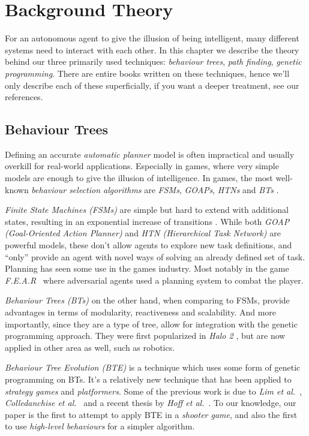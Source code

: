 \documentclass[a4paper, twocolumn]{article}
\begin{document}
    \section{Background Theory} \label{sec:background_theory}

    For an autonomous agent to give the illusion of being intelligent, many different systems need to interact with each other. In this chapter we describe the theory behind our three primarily used techniques: \emph{behaviour trees}, \emph{path finding}, \emph{genetic programming}. There are entire books written on these techniques, hence we'll only describe each of these superficially, if you want a deeper treatment, see our references.

        \subsection{Behaviour Trees} \label{sec:behaviour_trees}

        Defining an accurate \emph{automatic planner} model is often impractical and usually overkill for real-world applications. Especially in games, where very simple models are enough to give the illusion of intelligence. In games, the most well-known \emph{behaviour selection algorithms} are \emph{FSMs}, \emph{GOAPs}, \emph{HTNs} and \emph{BTs} \cite{dawe2014overview}.

        \emph{Finite State Machines (FSMs)} are simple but hard to extend with additional states, resulting in an exponential increase of transitions \cite{dawe2014overview}. While both \emph{GOAP (Goal-Oriented Action Planner)} and \emph{HTN (Hierarchical Task Network)} are powerful models, these don't allow agents to explore new task definitions, and ``only'' provide an agent with novel ways of solving an already defined set of task. Planning has seen some use in the games industry. Most notably in the game \textit{F.E.A.R}~\cite{orkin2006three} where adversarial agents used a planning system to combat the player.

        \emph{Behaviour Trees (BTs)} on the other hand, when comparing to FSMs, provide advantages in terms of modularity, reactiveness and scalability. And more importantly, since they are a type of tree, allow for integration with the genetic programming approach. They were first popularized in \emph{Halo 2} \cite{isla2005managing}, but are now applied in other area as well, such as robotics.

        \emph{Behaviour Tree Evolution (BTE)} is a technique which uses some form of genetic programming on BTs. It's a relatively new technique that has been applied to \emph{strategy games} and \emph{platformers}. Some of the previous work is due to \emph{Lim et al.}~\cite{lim2010evolving}, \emph{Colledanchise et al.}~\cite{colledanchise2015learning} and a recent thesis by \emph{Hoff et al.}~\cite{hoff2016evolving}. To our knowledge, our paper is the first to attempt to apply BTE in a \emph{shooter game}, and also the first to use \emph{high-level behaviours} for a simpler algorithm.
\end{document}
